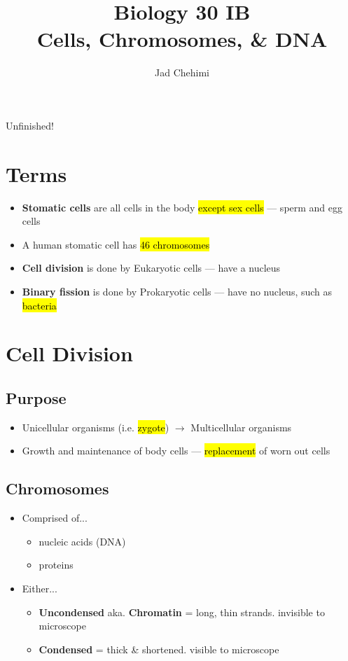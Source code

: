 \documentclass[a4paper,12pt]{article}
\title{Biology 30 IB \\ Cells, Chromosomes, \& DNA}
\author{Jad Chehimi}
\begin{document}
\maketitle

\begin{center}
\Huge
Unfinished!
\normalsize
\end{center}

\tableofcontents

\pagebreak

\section{Terms}
\begin{itemize}
    \item{\textbf{Stomatic cells} are all cells in the body \hl{except sex cells} --- sperm and egg cells}
    \item{A human stomatic cell has \hl{46 chromosomes}}
    \item{\textbf{Cell division} is done by Eukaryotic cells --- have a nucleus}
    \item{\textbf{Binary fission} is done by Prokaryotic cells --- have no nucleus, such as \hl{bacteria}}
\end{itemize}

\section{Cell Division}
\subsection{Purpose}
\begin{itemize}
    \item{Unicellular organisms (i.e. \hl{zygote}) $\longrightarrow$ Multicellular organisms}
    \item{Growth and maintenance of body cells --- \hl{replacement} of worn out cells}
\end{itemize}

\subsection{Chromosomes}
\begin{itemize}
    \item{
            Comprised of...
            \begin{itemize}
                \item{nucleic acids (DNA)}
                \item{proteins}
            \end{itemize}
        }
    \item{
            Either...
            \begin{itemize}
                \item{\textbf{Uncondensed} aka. \textbf{Chromatin} = long, thin strands. invisible to microscope}
                \item{\textbf{Condensed} = thick \& shortened. visible to microscope}
            \end{itemize}
        }
\end{itemize}
\end{document}
